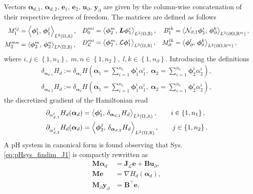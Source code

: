 Vectors $\bm{\alpha}_{d, 1},\, \bm{\alpha}_{d, 2}, \, \mathbf{e}_{1}, \, \mathbf{e}_{2}, \, \mathbf{u}_\partial, \, \mathbf{y}_\partial$ are given by the column-wise concatenation of their respective degrees of freedom. The matrices are defined as follows 
\begin{equation}
\begin{aligned}
M_1^{ij} &= \inner[L^2(\Omega, \mathbb{A})]{\bm\phi_1^i}{\bm\phi_1^j}, \\
M_2^{mn} &= \inner[L^2(\Omega, \mathbb{B})]{\bm\phi_2^m}{\bm\phi_2^n}, \\
\end{aligned}\quad
\begin{aligned}
{D}_{0}^{mi} &= \inner[L^2(\Omega, \mathbb{B})]{\bm\phi_2^m}{\bm{L}\bm\phi_1^i}, \\
{D}_{\mathcal{L}}^{mi} &= \inner[L^2(\Omega, \mathbb{B})]{\bm\phi_2^m}{\mathcal{L}\bm\phi_1^i}, 
\end{aligned}\quad  
\begin{aligned}
{B}_{1}^{ik} &= \inner[L^2(\partial \Omega, \mathbb{R}^m)]{\mathcal{N}_{\partial, 1}\bm\phi_1^i}{\bm\phi_\partial^k}, \\
M_\partial^{lk} &= \inner[L^2(\partial \Omega, \mathbb{R}^m)]{\bm\phi_\partial^l}{\bm\phi_\delta^k},
\end{aligned}
\end{equation}
where $i, j \in \left\{1, n_1\right\}, \; m,n \in \left\{1, n_2\right\}, \; l, k \in \left\{1, n_\partial \right\}$. Introducing the definitions
\begin{align*}
	\delta_{\bm{\alpha}_{d, 1}} H_d := \delta_{\bm{\alpha}_{1}} H\left(\bm{\alpha}_1 = \sum_{i=1}^{n_1} \bm{\phi}_1^i \alpha_1^i, \;  \bm{\alpha}_2 = \sum_{i=1}^{n_1} \bm{\phi}_2^i \alpha_2^i\right), \\
	\delta_{\bm{\alpha}_{d, 2}} H_d := \delta_{\bm{\alpha}_{2}} H\left(\bm{\alpha}_1 = \sum_{i=1}^{n_1} \bm{\phi}_1^i \alpha_1^i, \;  \bm{\alpha}_2 = \sum_{i=1}^{n_1} \bm{\phi}_2^i \alpha_2^i\right),
\end{align*}
the discretized gradient of the Hamiltonian read
\begin{equation}
\begin{aligned}
\partial_{{\alpha}_{d, 1}^i} H_d(\bm{\alpha}_d) &= \inner[L^2(\Omega, \mathbb{A})]{\bm\phi_1^i}{\delta_{\bm{\alpha}_{d, 1}} H_d}, \qquad i \in \left\{1, n_1\right\}, \\
\partial_{{\alpha}_{d, 2}^j} H_d(\bm{\alpha}_d) &= \inner[L^2(\Omega, \mathbb{B})]{\bm\phi_2^j}{\delta_{\bm{\alpha}_{d, 2}} H_d}, \qquad j \in \left\{1, n_2\right\}.
\end{aligned}
\end{equation}
A pH system in canonical form is found observing that Sys. \eqref{eq:pHsys_findim_J1} is compactly rewritten as 
\begin{align}
\mathbf{M} \dot{\bm{\alpha}}_{d} &= \mathbf{J}_{\mathcal{L}} \mathbf{e} + \mathbf{B}\mathbf{u}_\partial, \label{eq:pH_findim_dyn1} \\
\mathbf{M} \mathbf{e} &= \nabla H_d(\bm{\alpha}_d), \label{eq:pH_findin_e}\\
\mathbf{M}_\partial {\mathbf{y}_\partial} &= \mathbf{B}^\top \mathbf{e},
\end{align}

